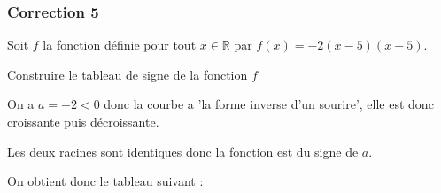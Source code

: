 \documentclass[15pt, mathserif]{beamer}
\newcommand{\R}{\mathbb{R}}			%
\begin{document}
\begin{frame}
\vspace{-10mm}
	\frametitle{Correction 5}
 \vspace*{1cm} Soit $f$ la fonction définie pour tout $x \in \R$ par $f(x)=-2(x-5)(x-5)$. 
 
  Construire le tableau de signe de la fonction $f$ 
 
 On a $a=-2<0$ donc la courbe a 'la forme inverse d'un sourire', elle est donc croissante puis décroissante. 
 
 Les deux racines sont identiques donc la fonction est du signe de $a$.  
 
 On obtient donc le tableau suivant : 
 \begin{center} 
 \end{center} 
\end{frame}
\end{document}
